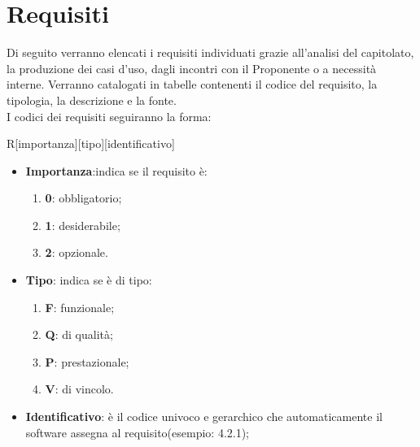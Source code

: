 \section{Requisiti}
\label{sec:Requisiti}
Di seguito verranno elencati i requisiti individuati grazie all'analisi del capitolato, la produzione dei casi d'uso, dagli incontri con il Proponente o a necessità interne. Verranno catalogati in tabelle contenenti il codice del requisito, la tipologia, la descrizione e la fonte.\\
I codici dei requisiti seguiranno la forma:
\begin{center}
	R[importanza][tipo][identificativo]
\end{center}
\begin{itemize}
	\item \textbf{Importanza}:indica se il requisito è:
	\begin{enumerate}
		\item \textbf{0}: obbligatorio;
		\item \textbf{1}: desiderabile;
		\item \textbf{2}: opzionale.
	\end{enumerate}
	\item \textbf{Tipo}: indica se è di tipo:
	\begin{enumerate}
		\item \textbf{F}: funzionale;
		\item \textbf{Q}: di qualità;
		\item \textbf{P}: prestazionale;
		\item \textbf{V}: di vincolo.
	\end{enumerate}
	\item \textbf{Identificativo}: è il codice univoco e gerarchico che automaticamente il software assegna al requisito(esempio: 4.2.1);
\end{itemize}
